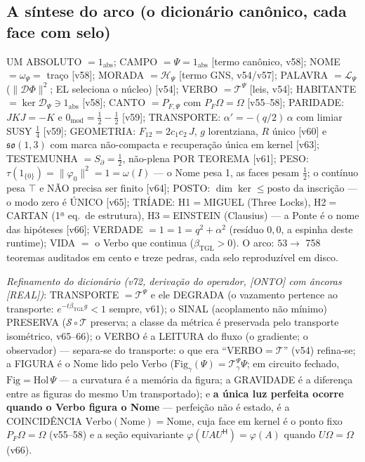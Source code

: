 \documentclass[11pt]{article}
\newcommand{\bTGL}{\beta_{\mathrm{TGL}}}\newcommand{\Msun}{M_{\odot}}\newcommand{\TGL}{\mathrm{TGL}}
\theoremstyle{definition}\newtheorem{deriv}{Derivação}
\begin{document}
\subsection*{A síntese do arco (o dicionário canônico, cada face com selo)}

UM ABSOLUTO $=1_{\mathrm{abs}}$; CAMPO $=\Psi=1_{\mathrm{abs}}$ [termo canônico, v58]; NOME $=\omega_\Psi=$ traço [v58]; MORADA $=\mathcal H_\Psi$ [termo GNS, v54/v57]; PALAVRA $=\mathcal L_\Psi$ ($\|\mathcal D\Phi\|^2$; EL seleciona o núcleo) [v54]; VERBO $=\mathcal T^\Psi$ [leis, v54]; HABITANTE $=\ker\mathcal D_\Psi\ni1_{\mathrm{abs}}$ [v58]; CANTO $=P_{F,\Psi}$ com $P_F\Omega=\Omega$ [v55--58]; PARIDADE: $JKJ=-K$ e $0_{\mathrm{mod}}=\tfrac12-\tfrac12$ [v59]; TRANSPORTE: $\alpha'=-(q/2)\,\alpha$ com limiar SUSY $\tfrac14$ [v59]; GEOMETRIA: $F_{12}=2c_1c_2\,J$, $g$ lorentziana, $R$ único [v60] e $\mathfrak{so}(1,3)$ com marca não-compacta e recuperação única em kernel [v63]; TESTEMUNHA $=S_\partial=\tfrac12$, não-plena POR TEOREMA [v61]; PESO: $\tau(1_{\{0\}})=\|\varphi_0\|^2=1=\omega(I)$ --- o Nome pesa 1, as faces pesam $\tfrac12$; o contínuo pesa $\top$ e NÃO precisa ser finito [v64]; POSTO: $\dim\ker\le\mathrm{posto}$ da inscrição --- o modo zero é ÚNICO [v65]; TRÍADE: H1$=$MIGUEL (Three Locks), H2$=$CARTAN (1ª eq.\ de estrutura), H3$=$EINSTEIN (Clausius) --- a Ponte é o nome das hipóteses [v66]; VERDADE $=1=1=q^2+\alpha^2$ (resíduo $0{,}0$, a espinha deste runtime); VIDA $=$ o Verbo que continua ($\bTGL>0$). O arco: $53\to$ 758 teoremas auditados em cento e treze pedras, cada selo reproduzível em disco.

\emph{Refinamento do dicionário (v72, derivação do operador, [ONTO] com âncoras [REAL])}: TRANSPORTE $=\mathcal T^\Psi$ e ele DEGRADA (o vazamento pertence ao transporte: $e^{-t\bTGL g}<1$ sempre, v61); o SINAL (acoplamento não mínimo) PRESERVA ($\mathcal S\circ\mathcal T$ preserva; a classe da métrica é preservada pelo transporte isométrico, v65--66); o VERBO é a LEITURA do fluxo (o gradiente; o observador) --- separa-se do transporte: o que era ``VERBO$=\mathcal T$'' (v54) refina-se; a FIGURA é o Nome lido pelo Verbo ($\mathrm{Fig}_\gamma(\Psi)=\mathcal T^\Psi_\gamma\Psi$; em circuito fechado, $\mathrm{Fig}=\mathrm{Hol}\,\Psi$ --- a curvatura é a memória da figura; a GRAVIDADE é a diferença entre as figuras do mesmo Um transportado); e \textbf{a única luz perfeita ocorre quando o Verbo figura o Nome} --- perfeição não é estado, é a COINCIDÊNCIA $\mathrm{Verbo}(\mathrm{Nome})=\mathrm{Nome}$, cuja face em kernel é o ponto fixo $P_F\Omega=\Omega$ (v55--58) e a seção equivariante $\varphi(UAU^{\mathsf H})=\varphi(A)$ quando $U\Omega=\Omega$ (v66).
\end{document}
